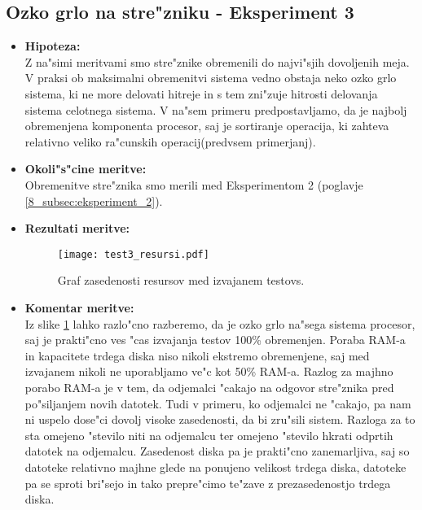 \newpage
\subsection{Ozko grlo na stre"zniku - Eksperiment 3}
\begin{itemize}
	\item \textbf{Hipoteza: }  \\
		Z na"simi meritvami smo stre"znike obremenili do najvi"sjih dovoljenih meja. V praksi ob maksimalni obremenitvi sistema vedno obstaja neko ozko grlo sistema, ki ne more delovati hitreje in s tem zni"zuje hitrosti delovanja sistema celotnega sistema. V na"sem primeru predpostavljamo, da je najbolj obremenjena komponenta procesor, saj je sortiranje operacija, ki zahteva relativno veliko ra"cunskih operacij(predvsem primerjanj). 
			
	\item \textbf{Okoli"s"cine meritve: } \\
		Obremenitve stre"znika smo merili med Eksperimentom 2 (poglavje \ref{8_subsec:eksperiment_2}). 

 	\item \textbf{Rezultati meritve: }  \\
		\begin{figure}[!htb]
  		\centering
  		  \texttt{[image: test3\_resursi.pdf]}
  		\caption{Graf zasedenosti resursov med izvajanem testovs.}
  		\label{8_graf_zasedenost_resursov}
		\end{figure}


	\item \textbf{Komentar meritve: } \\ 
		Iz slike \ref{8_graf_zasedenost_resursov} lahko razlo"cno razberemo, da je ozko grlo na"sega sistema procesor, saj je prakti"cno ves "cas izvajanja testov 100\% obremenjen. Poraba RAM-a in kapacitete trdega diska niso nikoli ekstremo obremenjene, saj med izvajanem nikoli ne uporabljamo ve"c kot 50\% RAM-a. Razlog za majhno porabo RAM-a je v tem, da odjemalci "cakajo na odgovor stre"znika pred po"siljanjem novih datotek. Tudi v primeru, ko odjemalci ne "cakajo, pa nam ni uspelo dose"ci dovolj visoke zasedenosti, da bi zru"sili sistem. Razloga za to sta omejeno "stevilo niti na odjemalcu ter omejeno "stevilo hkrati odprtih datotek na odjemalcu. Zasedenost diska pa je prakti"cno zanemarljiva, saj so datoteke relativno majhne glede na ponujeno velikost trdega diska, datoteke pa se sproti bri"sejo in tako prepre"cimo te"zave z prezasedenostjo trdega diska. 
\end{itemize}

